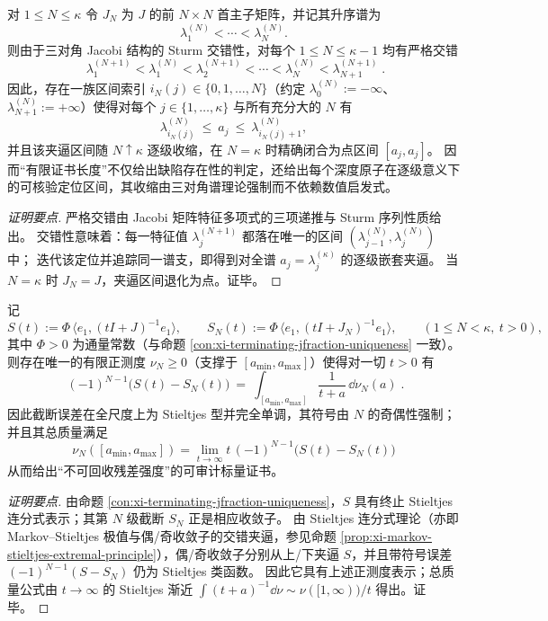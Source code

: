 \begin{proposition}\label{prop:xi-jacobi-sturm-nested-localization}
对 \(1\le N\le \kappa\) 令 \(J_N\) 为 \(J\) 的前 \(N\times N\) 首主子矩阵，并记其升序谱为
\[
\lambda^{(N)}_1<\cdots<\lambda^{(N)}_N.
\]
则由于三对角 Jacobi 结构的 Sturm 交错性，对每个 \(1\le N\le \kappa-1\) 均有严格交错
\[
\boxed{\;
\lambda^{(N+1)}_1<\lambda^{(N)}_1<\lambda^{(N+1)}_2<\cdots<
\lambda^{(N)}_N<\lambda^{(N+1)}_{N+1}\; }.
\]
因此，存在一族区间索引 \(i_N(j)\in\{0,1,\dots,N\}\)（约定 \(\lambda^{(N)}_0:=-\infty\)、\(\lambda^{(N)}_{N+1}:=+\infty\)）使得对每个 \(j\in\{1,\dots,\kappa\}\) 与所有充分大的 \(N\) 有
\[
\lambda^{(N)}_{i_N(j)}\ \le\ a_j\ \le\ \lambda^{(N)}_{i_N(j)+1},
\]
并且该夹逼区间随 \(N\uparrow \kappa\) 逐级收缩，在 \(N=\kappa\) 时精确闭合为点区间 \([a_j,a_j]\)。
因而“有限证书长度”不仅给出缺陷存在性的判定，还给出每个深度原子在逐级意义下的可核验定位区间，其收缩由三对角谱理论强制而不依赖数值启发式。
\end{proposition}
\begin{proof}[证明要点]
严格交错由 Jacobi 矩阵特征多项式的三项递推与 Sturm 序列性质给出。
交错性意味着：每一特征值 \(\lambda^{(N+1)}_j\) 都落在唯一的区间 \((\lambda^{(N)}_{j-1},\lambda^{(N)}_{j})\) 中；
迭代该定位并追踪同一谱支，即得到对全谱 \(a_j=\lambda^{(\kappa)}_j\) 的逐级嵌套夹逼。
当 \(N=\kappa\) 时 \(J_N=J\)，夹逼区间退化为点。证毕。
\end{proof}

\begin{proposition}\label{prop:xi-jacobi-truncation-remainder-stieltjes}
记
\[
S(t):=\Phi\,\langle e_1,(tI+J)^{-1}e_1\rangle,
\qquad
S_N(t):=\Phi\,\langle e_1,(tI+J_N)^{-1}e_1\rangle,
\qquad (1\le N<\kappa,\ t>0),
\]
其中 \(\Phi>0\) 为通量常数（与命题 \ref{con:xi-terminating-jfraction-uniqueness} 一致）。
则存在唯一的有限正测度 \(\nu_N\ge 0\)（支撑于 \([a_{\min},a_{\max}]\)）使得对一切 \(t>0\) 有
\[
\boxed{\;
(-1)^{N-1}\bigl(S(t)-S_N(t)\bigr)
\ =\ \int_{[a_{\min},a_{\max}]}\frac{1}{t+a}\,\dd\nu_N(a)\; }.
\]
因此截断误差在全尺度上为 Stieltjes 型并完全单调，其符号由 \(N\) 的奇偶性强制；
并且其总质量满足
\[
\boxed{\;
\nu_N([a_{\min},a_{\max}])
=\lim_{t\to\infty}t\,(-1)^{N-1}\bigl(S(t)-S_N(t)\bigr)\;}
\]
从而给出“不可回收残差强度”的可审计标量证书。
\end{proposition}
\begin{proof}[证明要点]
由命题 \ref{con:xi-terminating-jfraction-uniqueness}，\(S\) 具有终止 Stieltjes 连分式表示；其第 \(N\) 级截断 \(S_N\) 正是相应收敛子。
由 Stieltjes 连分式理论（亦即 Markov--Stieltjes 极值与偶/奇收敛子的交错夹逼，参见命题 \ref{prop:xi-markov-stieltjes-extremal-principle}），偶/奇收敛子分别从上/下夹逼 \(S\)，并且带符号误差 \((-1)^{N-1}(S-S_N)\) 仍为 Stieltjes 类函数。
因此它具有上述正测度表示；总质量公式由 \(t\to\infty\) 的 Stieltjes 渐近 \(\int (t+a)^{-1}\dd\nu\sim \nu([1,\infty))/t\) 得出。证毕。
\end{proof}

